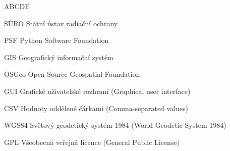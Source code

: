 
\begin{seznamzkratek}{ABCDE}

	      {SÚRO}
	      {Státní ústav radiační ochrany}
	      
		  {PSF}
	      {Python Software Foundation}

	      {GIS}
	      {Geografický informační systém}

	      {OSGeo}
	      {Open Source Geospatial Foundation}
	         
	      {GUI}
	      {Grafické uživatelské rozhraní (Graphical user interface)}
	      
	      {CSV}
	      {Hodnoty oddělené čárkami (Comma-separated values)}
	      
	      {WGS84}
	      {Světový geodetický systém 1984 (World Geodetic System 1984)}

	      {GPL}
	      {Všeobecná veřejná licence (General Public License)}

\end{seznamzkratek}